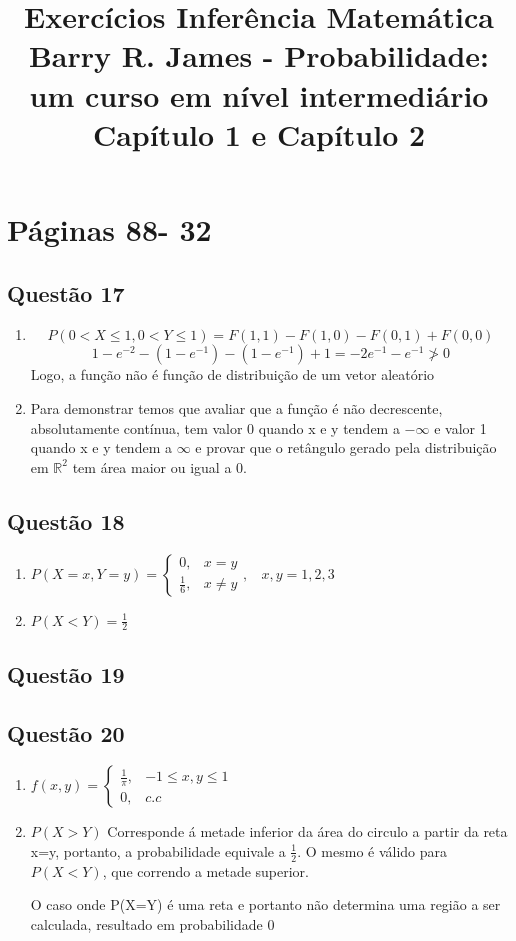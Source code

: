 \documentclass[a4paper,12pt]{report}
\author{}
\title{Exercícios Inferência Matemática\\
Barry R. James - Probabilidade: um curso em nível intermediário\\
Capítulo 1 e Capítulo 2
}
\date{}
\begin{document}
	\maketitle
	\tableofcontents	
	\newpage
	
	
	\chapter{Páginas 88- 32}
	\section*{Questão 17}
	 \begin{enumerate}[label=\alph*)]
	 	\item 
	 	$$P(0<X\le 1 , 0 <Y\le 1) = F(1,1) - F(1,0)-F(0,1)+F(0,0) $$
	 	$$1-e^{-2} - (1-e^{-1})  - (1-e^{-1}) + 1 = -2e^{-1} -e^{-1}\not>0 $$
	 	Logo, a função não é função de distribuição de um vetor aleatório
	 	
	 	\item Para demonstrar temos que avaliar que a função é não decrescente, absolutamente contínua, tem valor 0 quando x e y tendem a $-\infty$ e valor 1 quando x e y tendem a $\infty$ e provar que  o  retângulo gerado pela distribuição em $\mathbb R^2$ tem área maior ou igual a 0.
	 \end{enumerate}
	 		\section*{Questão 18}

 	
	 	\begin{enumerate}[label=\alph*)]
	 		\item  $P(X=x,Y=y)=\begin{cases}
	 			0, & x=y\\
	 			\frac{1}{6}, & x\ne y
	 		\end{cases}, \ \ \ \  x,y=1,2,3$
	 			 	\item  $P(X<Y) = \frac{1}{2}$
	 	\end{enumerate}
	 	
	\section*{Questão 19}
	
		\section*{Questão 20}
		\begin{enumerate}[label=\alph*)]
			\item $f(x,y)=\begin{cases}
			\frac{1}{\pi}, & -1\le x,y\le 1\\
			0, & c.c
			\end{cases}$
			\item $P(X>Y)$ Corresponde á metade inferior da área do circulo a partir da reta x=y, portanto, a probabilidade equivale a  $\frac{1}{2}$. O mesmo é válido para $P(X<Y)$, que correndo a metade superior.
			
			O caso onde P(X=Y) é uma reta e portanto não determina uma região a ser calculada, resultado em probabilidade 0
		\end{enumerate}
	
\end{document}
